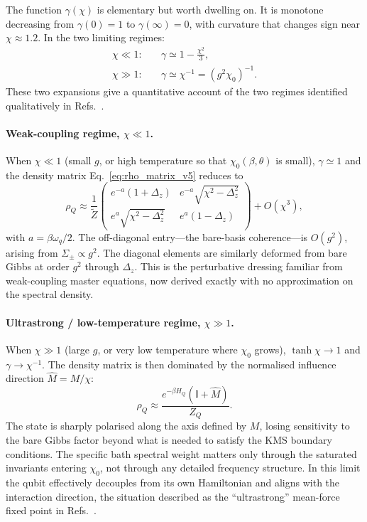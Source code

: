 The function $\gamma(\chi)$ is elementary but worth dwelling on.  It is
monotone decreasing from $\gamma(0)=1$ to $\gamma(\infty)=0$, with curvature
that changes sign near $\chi\approx 1.2$.  In the two limiting regimes:
\begin{align}
  \chi \ll 1:\quad & \gamma \simeq 1 - \tfrac{\chi^2}{3},
  \label{eq:gamma_weak}\\
  \chi \gg 1:\quad & \gamma \simeq \chi^{-1} = (g^2\chi_0)^{-1}.
  \label{eq:gamma_strong}
\end{align}
These two expansions give a quantitative account of the two regimes identified
qualitatively in Refs.~\cite{cresserWeakUltrastrongCoupling2021a,hovhannisyanHamiltonianMeanForce2020}.

\paragraph{Weak-coupling regime, $\chi\ll 1$.}

When $\chi\ll 1$ (small $g$, or high temperature so that $\chi_0(\beta,\theta)$
is small), $\gamma\simeq 1$ and the density matrix
Eq.~\eqref{eq:rho_matrix_v5} reduces to
\begin{equation}
  \rho_Q \approx \frac{1}{\tilde Z}\begin{pmatrix}
    e^{-a}(1+\Delta_z) & e^{-a}\sqrt{\chi^2-\Delta_z^2}\\
    e^{a}\sqrt{\chi^2-\Delta_z^2} & e^{a}(1-\Delta_z)
  \end{pmatrix} + O(\chi^3),
\end{equation}
with $a=\beta\omega_q/2$.  The off-diagonal entry---the bare-basis coherence---is
$O(g^2)$, arising from $\Sigma_\pm\propto g^2$.  The diagonal elements are
similarly deformed from bare Gibbs at order $g^2$ through $\Delta_z$.  This is
the perturbative dressing familiar from weak-coupling master equations, now
derived exactly with no approximation on the spectral density.

\paragraph{Ultrastrong / low-temperature regime, $\chi\gg 1$.}

When $\chi\gg 1$ (large $g$, or very low temperature where $\chi_0$ grows),
$\tanh\chi\to 1$ and $\gamma\to\chi^{-1}$.  The density matrix is then
dominated by the normalised influence direction $\hat{M}=M/\chi$:
\begin{equation}
  \rho_Q \approx \frac{e^{-\beta H_Q}\!\left(\mathbb{I} + \hat{M}\right)}{Z_Q}.
\end{equation}
The state is sharply polarised along the axis defined by $M$, losing
sensitivity to the bare Gibbs factor beyond what is needed to satisfy the KMS
boundary conditions.  The specific bath spectral weight matters only through the
saturated invariants entering $\chi_0$, not through any detailed frequency
structure.  In this limit the qubit effectively decouples from its own
Hamiltonian and aligns with the interaction direction, the situation described
as the ``ultrastrong'' mean-force fixed point in
Refs.~\cite{cresserWeakUltrastrongCoupling2021a,hovhannisyanHamiltonianMeanForce2020}.

